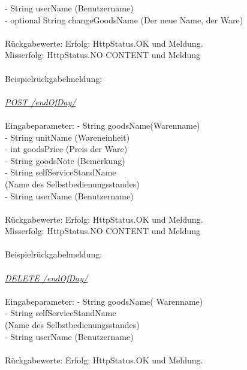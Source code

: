 \tab \tab                        		- String userName (Benutzername)\\
\tab \tab                        		- optional String changeGoodsName (Der neue Name, der Ware)\\
\\
Rückgabewerte: \tab 					Erfolg: HttpStatus.OK und Meldung.\\
\tab \tab 								Misserfolg: HttpStatus.NO CONTENT und Meldung\\
\\
Beispielrückgabelmeldung:	
\\
\\	
\textit{\underline{POST /endOfDay/}}
\\
\\
Eingabeparameter: \tab			- String goodsName(Warenname)\\
\tab \tab                        		- String unitName	(Wareneinheit)\\
\tab \tab                         		- int goodsPrice (Preis der Ware)\\
\tab \tab                         		- String goodsNote (Bemerkung)    \\                  
\tab \tab                         		- String selfServiceStandName \\
\tab \tab								 (Name des Selbstbedienungsstandes)\\
\tab \tab                        		- String userName (Benutzername)\\
\\
Rückgabewerte: \tab 					Erfolg: HttpStatus.OK und Meldung.\\
\tab \tab 								Misserfolg: HttpStatus.NO CONTENT und Meldung\\
\\
Beispielrückgabelmeldung:	
\\
\\
\textit{\underline{DELETE /endOfDay/}}
\\
\\
Eingabeparameter: \tab			- String goodsName( Warenname)\\                
\tab \tab                         		- String selfServiceStandName \\
\tab \tab								(Name des Selbstbedienungsstandes)\\
\tab \tab                        		- String userName (Benutzername)\\
\\
Rückgabewerte: \tab 					Erfolg: HttpStatus.OK und Meldung.\\
